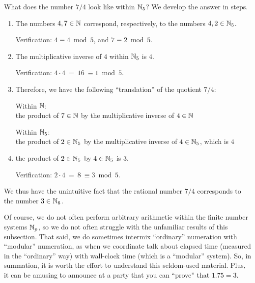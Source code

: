 What does the number $7/4$ look like within $\mathbb{N}_5$?  We develop the answer in steps.

\medskip

\noindent {}
\medskip

\begin{enumerate}
\item
The numbers $4, 7 \in \mathbb{N}$ correspond, respectively, to the numbers $4, 2 \in \mathbb{N}_5$.

\smallskip

Verification:
$4 \equiv 4 \bmod 5$, and $7 \equiv 2 \bmod 5$.

\item
The multiplicative inverse of $4$ within $\mathbb{N}_5$ is $4$.

\smallskip

Verification:
$4 \cdot 4 \ = \ 16 \ \equiv 1 \bmod 5$.

\item
Therefore, we have the following ``translation'' of the quotient $7/4$:

\smallskip

Within $\mathbb{N}$: \\
the product of $7 \in \mathbb{N}$ by the multiplicative inverse of $4 \in \mathbb{N}$

\smallskip

Within $\mathbb{N}_5$: \\
the product of $2 \in \mathbb{N}_5$ by the multiplicative inverse of $4 \in
\mathbb{N}_5$, which is $4$

\item
the product of $2 \in \mathbb{N}_5$ by $4 \in \mathbb{N}_5$ is $3$.

\smallskip

Verification:
$2 \cdot 4 \ = \ 8 \ \equiv 3 \bmod 5$.
\end{enumerate}
We thus have the unintuitive fact that the rational number $7/4$ corresponds to the number $3 \in \mathbb{N}_6$.

\medskip

Of course, we do not often perform arbitrary arithmetic within the finite number systems $\mathbb{N}_p$, so we do not often struggle with the unfamiliar results of this subsection.  That said, we do sometimes
intermix ``ordinary'' numeration with ``modular'' numeration, as when we coordinate talk about elapsed time (measured in the ``ordinary'' way) with wall-clock time (which is a ``modular'' system).  So, in summation, it is worth the effort to understand this seldom-used material.  Plus, it can be amusing to announce at a party that you can ``prove'' that $1.75 = 3$.

